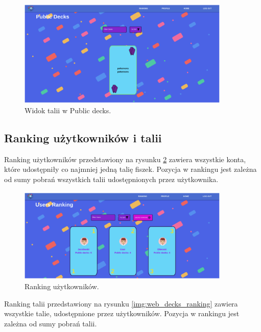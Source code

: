 \begin{figure}[H]
    \centering
    \includegraphics[width=0.9\textwidth]{chapters/chapter_10/images_web/web_public_decks}
    \caption{Widok talii w Public decks.}
    \label{img:web_public_decks}
\end{figure}


\subsection{Ranking użytkowników i talii}
Ranking użytkowników przedstawiony na rysunku \ref{img:web_user_ranking} zawiera wszystkie konta, które udostępniły co najmniej jedną talię fiszek. Pozycja w rankingu jest zależna od sumy pobrań wszystkich talii udostępnionych przez użytkownika.


\begin{figure}[H]
    \centering
    \includegraphics[width=0.9\textwidth]{chapters/chapter_10/images_web/web_user_ranking}
    \caption{Ranking użytkowników.}
    \label{img:web_user_ranking}
\end{figure}

Ranking talii przedstawiony na rysunku \ref{img:web_decks_ranking} zawiera wszystkie talie, udostępnione przez użytkowników. Pozycja w rankingu jest zależna od sumy pobrań talii.

